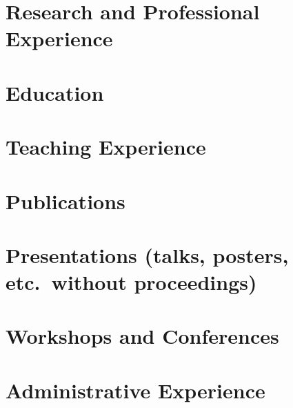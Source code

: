 \documentclass[10pt,a4paper,sans]{moderncv}
\begin{document}
\makecvtitle

\section*{}


\section{Research and Professional Experience}


\section{Education}


\section{Teaching Experience}


\section{Publications}


\section{Presentations {\footnotesize (talks, posters, etc.~without proceedings)}}


\section{Workshops and Conferences}


\section{Administrative Experience}

\end{document}
